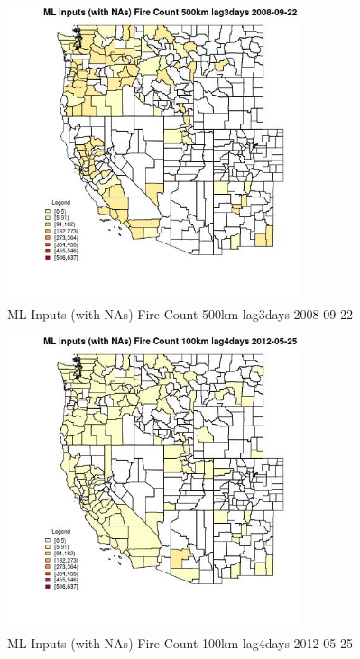 \begin{figure} 
\centering  
\includegraphics[width=0.77\textwidth]{Code_Outputs/Report_ML_input_PM25_Step4_part_e_de_duplicated_aves_compiled_2019-05-18wNAs_CountyFire_Count_500km_lag3daysMean2008-09-22.jpg} 
\caption{\label{fig:Report_ML_input_PM25_Step4_part_e_de_duplicated_aves_compiled_2019-05-18wNAsCountyFire_Count_500km_lag3daysMean2008-09-22}ML Inputs (with NAs) Fire Count 500km lag3days 2008-09-22} 
\end{figure} 
 

\begin{figure} 
\centering  
\includegraphics[width=0.77\textwidth]{Code_Outputs/Report_ML_input_PM25_Step4_part_e_de_duplicated_aves_compiled_2019-05-18wNAs_CountyFire_Count_100km_lag4daysMean2012-05-25.jpg} 
\caption{\label{fig:Report_ML_input_PM25_Step4_part_e_de_duplicated_aves_compiled_2019-05-18wNAsCountyFire_Count_100km_lag4daysMean2012-05-25}ML Inputs (with NAs) Fire Count 100km lag4days 2012-05-25} 
\end{figure} 
 

